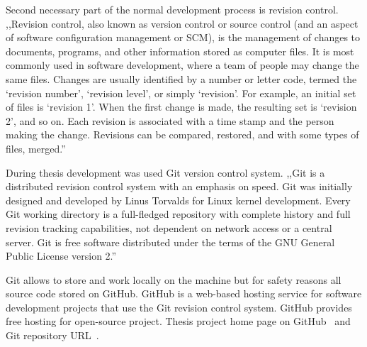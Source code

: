 Second necessary part of the normal development process is revision control. ,,Revision control, also known as version control or source control (and an aspect of software configuration management or SCM), is the management of changes to documents, programs, and other information stored as computer files. It is most commonly used in software development, where a team of people may change the same files. Changes are usually identified by a number or letter code, termed the `revision number', `revision level', or simply `revision'. For example, an initial set of files is `revision 1'. When the first change is made, the resulting set is `revision 2', and so on. Each revision is associated with a time stamp and the person making the change. Revisions can be compared, restored, and with some types of files, merged.''~\cite{REVISION_CONTROL}


During thesis development was used Git version control system. ,,Git is a distributed revision control system with an emphasis on speed. Git was initially designed and developed by Linus Torvalds for Linux kernel development. Every Git working directory is a full-fledged repository with complete history and full revision tracking capabilities, not dependent on network access or a central server. Git is free software distributed under the terms of the GNU General Public License version 2.''~\cite{GIT}


Git allows to store and work locally on the machine but for safety reasons all source code stored on GitHub. GitHub is a web-based hosting service for software development projects that use the Git revision control system. GitHub provides free hosting for open-source project. Thesis project home page on GitHub~\cite{GitHub_homepage} and Git repository URL~\cite{GitHub_repository}.

